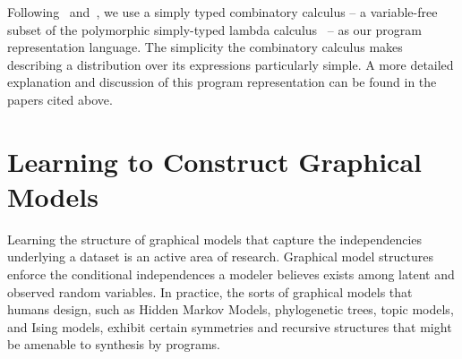 \documentclass{article} %
\begin{document}
Following~\cite{DBLP:conf/ijcai/DechterMAT13} and~\cite{DBLP:conf/icml/LiangJK10}, we use a
simply typed combinatory calculus -- a variable-free subset of the
polymorphic simply-typed lambda calculus~\cite{DBLP:books/daglib/0005958} -- as our
program representation language. The simplicity the combinatory calculus makes describing a distribution over its expressions particularly simple. A more detailed explanation and discussion of this program representation can be found in the papers cited above. 

\section{Learning to Construct Graphical Models}

Learning the structure of graphical models that capture the independencies underlying a dataset is an active area of research\cite{adams-wallach-ghahramani-2010a}\cite{ISI:000240797500002}\cite{ISI:000178037200004}\cite{ISI:A1995RX35400001}. Graphical model structures enforce the conditional independences a modeler believes exists among latent and observed random variables\cite{DBLP:books/daglib/0066829}.
In practice, the sorts of graphical models that humans design, such as Hidden Markov Models, phylogenetic trees, topic models, and Ising models, exhibit certain symmetries and recursive structures that might be amenable to synthesis by programs.
\end{document}
